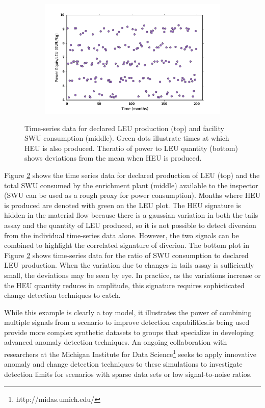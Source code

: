 \begin{figure}
\begin{subfigure}{0.6\textwidth}
            \includegraphics[natwidth=162bp,natheight=227bp, scale=0.6]{./figs/mm_5enrich_tinytails_inspratio_swu_leu.png}
            \label{fig:ratio}
    \end{subfigure}
    \caption{Time-series data for declared LEU production (top) and facility SWU consumption (middle). Green dots illustrate times at which HEU is also produced.  Theratio of power to LEU quantity (bottom) shows deviations from the mean when HEU is produced.}
    \label{fig:time_series}
\end{figure}


Figure \ref{fig:time_series} shows the time series data for declared production of \gls{LEU} (top) and the total \gls{SWU} consumed by the enrichment plant (middle) available to the inspector (\gls{SWU} can be used as a rough proxy for power consumption).  Months where \gls{HEU} is produced are denoted with green on the \gls{LEU} plot.  The \gls{HEU} signature is hidden in the material flow because there is a gaussian variation in both the tails assay and the quantity of LEU produced, so it is not possible to detect diversion from the individual time-series data alone. However, the two signals can be combined to highlight the correlated signature of diverion. The bottom plot in Figure \ref{fig:time_series} shows time-series data for the ratio of SWU consumption to declared \gls{LEU} production.  When the variation due to changes in tails assay is sufficiently small, the deviations may be seen by eye. In practice, as the variations increase or the \gls{HEU} quantity reduces in amplitude, this signature requires sophisticated change detection techniques to catch.

While this example is clearly a toy model, it illustrates the power of combining multiple signals from a scenario to improve detection capabilities.\Cyclus is being used provide more complex synthetic datasets to groups that specialize in developing advanced anomaly detection techniques. An ongoing collaboration with researchers at the Michigan Institute for Data Science\footnote{http://midas.umich.edu/} seeks to apply innovative anomaly and change detection techniques to these simulations to investigate detection limits for scenarios with sparse data sets or low signal-to-noise ratios.

